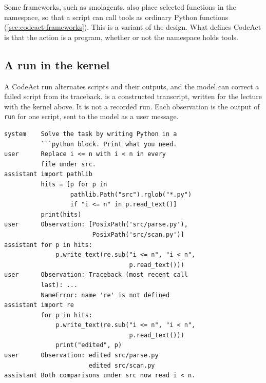 Some frameworks, such as smolagents, also place selected functions in the namespace, so that a
script can call tools as ordinary Python functions (\cref{sec:codeact-frameworks}). This is a
variant of the design. What defines CodeAct is that the action is a program, whether or not the
namespace holds tools.

\subsection{A run in the kernel}
\label{sec:codeact-run}

A CodeAct run alternates scripts and their outputs, and the model can correct a failed script from
its traceback.  is a constructed transcript, written for the lecture with the
kernel above. It is not a recorded run. Each observation is the output of \texttt{run} for one
script, sent to the model as a user message.

\begin{lstlisting}[basicstyle=\ttfamily\footnotesize, columns=fixed, basewidth=0.525em, caption={Constructed CodeAct transcript for the task of \cref{lst:codeact-actions}. The scripts are shown without the fences that enclose them in the replies.}, label=lst:codeact-run]
system    Solve the task by writing Python in a
          ```python block. Print what you need.
user      Replace i <= n with i < n in every
          file under src.
assistant import pathlib
          hits = [p for p in
                  pathlib.Path("src").rglob("*.py")
                  if "i <= n" in p.read_text()]
          print(hits)
user      Observation: [PosixPath('src/parse.py'),
                        PosixPath('src/scan.py')]
assistant for p in hits:
              p.write_text(re.sub("i <= n", "i < n",
                                  p.read_text()))
user      Observation: Traceback (most recent call
          last): ...
          NameError: name 're' is not defined
assistant import re
          for p in hits:
              p.write_text(re.sub("i <= n", "i < n",
                                  p.read_text()))
              print("edited", p)
user      Observation: edited src/parse.py
                       edited src/scan.py
assistant Both comparisons under src now read i < n.
\end{lstlisting}

